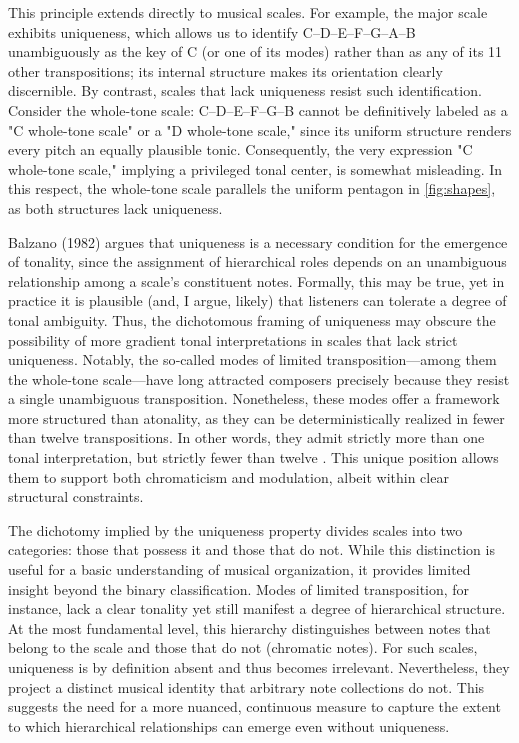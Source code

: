 \documentclass[10pt,twocolumn]{article}
\numberwithin{equation}{section} %
\begin{document}
    This principle extends directly to musical scales.
    For example, the major scale exhibits uniqueness, which allows us to identify C–D–E–F–G–A–B unambiguously as the key of C (or one of its modes) rather than as any of its 11 other transpositions; its internal structure makes its orientation clearly discernible.
    By contrast, scales that lack uniqueness resist such identification.
    Consider the whole-tone scale: C–D–E–F\text{$\sharp$}–G\text{$\sharp$}–B\text{$\flat$} cannot be definitively labeled as a "C whole-tone scale" or a "D whole-tone scale," since its uniform structure renders every pitch an equally plausible tonic.
    Consequently, the very expression "C whole-tone scale," implying a privileged tonal center, is somewhat misleading.
    In this respect, the whole-tone scale parallels the uniform pentagon in \autoref{fig:shapes}, as both structures lack uniqueness.

    Balzano (1982) argues that uniqueness is a necessary condition for the emergence of tonality, since the assignment of hierarchical roles depends on an unambiguous relationship among a scale's constituent notes.
    Formally, this may be true, yet in practice it is plausible (and, I argue, likely) that listeners can tolerate a degree of tonal ambiguity.
    Thus, the dichotomous framing of uniqueness may obscure the possibility of more gradient tonal interpretations in scales that lack strict uniqueness.
    Notably, the so‑called modes of limited transposition—among them the whole‑tone scale—have long attracted composers precisely because they resist a single unambiguous transposition.
    Nonetheless, these modes offer a framework more structured than atonality, as they can be deterministically realized in fewer than twelve transpositions.
    In other words, they admit strictly more than one tonal interpretation, but strictly fewer than twelve \citep{Messiaen1944}.
    This unique position allows them to support both chromaticism and modulation, albeit within clear structural constraints.

    The dichotomy implied by the uniqueness property divides scales into two categories: those that possess it and those that do not.
    While this distinction is useful for a basic understanding of musical organization, it provides limited insight beyond the binary classification.
    Modes of limited transposition, for instance, lack a clear tonality yet still manifest a degree of hierarchical structure.
    At the most fundamental level, this hierarchy distinguishes between notes that belong to the scale and those that do not (chromatic notes).
    For such scales, uniqueness is by definition absent and thus becomes irrelevant.
    Nevertheless, they project a distinct musical identity that arbitrary note collections do not.
    This suggests the need for a more nuanced, continuous measure to capture the extent to which hierarchical relationships can emerge even without uniqueness.
\end{document}
